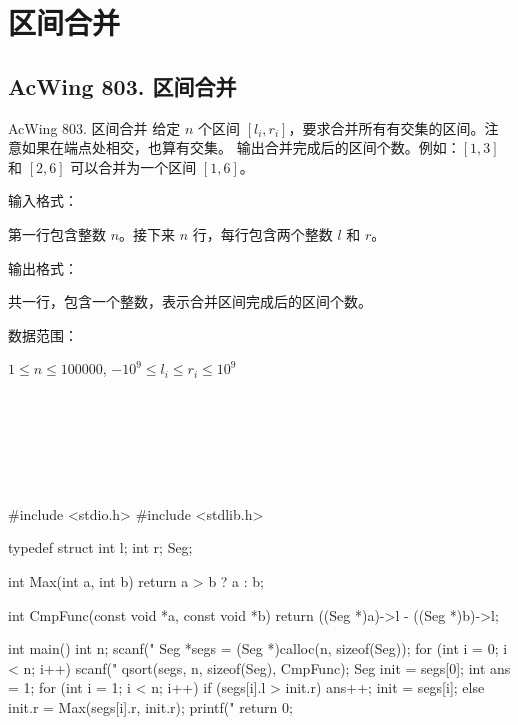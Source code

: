 \section{区间合并}

\subsection{AcWing 803. 区间合并}
\begin{titledbox}{AcWing 803. 区间合并}
    给定 $n$ 个区间 $[l_i, r_i]$，要求合并所有有交集的区间。注意如果在端点处相交，也算有交集。
    输出合并完成后的区间个数。例如：$[1, 3]$ 和 $[2, 6]$ 可以合并为一个区间 $[1, 6]$。

    输入格式：

    第一行包含整数 $n$。接下来 $n$ 行，每行包含两个整数 $l$ 和 $r$。

    输出格式：

    共一行，包含一个整数，表示合并区间完成后的区间个数。

    数据范围：

    $1 \le n \le 100000$, $-10^9 \le l_i \le r_i \le 10^9$

    \begin{inputblock}
         \\
         \\
         \\
         \\
         \\
    \end{inputblock}
    \begin{outputblock}
    \end{outputblock}
\end{titledbox}

\begin{mycpptwocol}[区间合并]
    #include <stdio.h>
    #include <stdlib.h>

    typedef struct {
        int l;
        int r;
    } Seg;

    int Max(int a, int b) {
        return a > b ? a : b;
    }

    int CmpFunc(const void *a, const void *b) {
        return ((Seg *)a)->l - ((Seg *)b)->l;
    }

    int main() {
        int n;
        scanf("%
        Seg *segs = (Seg *)calloc(n, sizeof(Seg));
        for (int i = 0; i < n; i++) {
            scanf("%
        }
        qsort(segs, n, sizeof(Seg), CmpFunc);
        Seg init = segs[0];
        int ans = 1;
        for (int i = 1; i < n; i++) {
            if (segs[i].l > init.r) {
                ans++;
                init = segs[i];
            } else {
                init.r = Max(segs[i].r, init.r);
            }
        }
        printf("%
        return 0;
    }
\end{mycpptwocol}